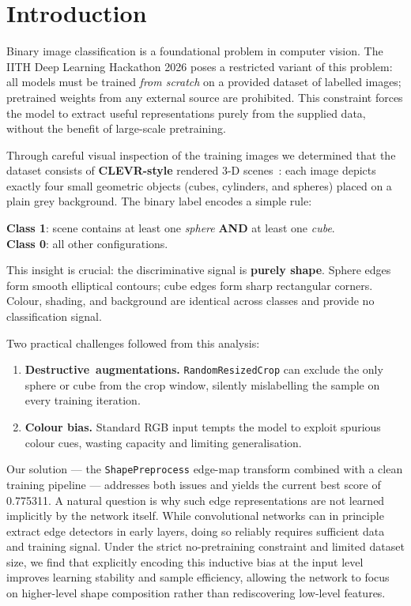 \documentclass{article}
\theoremstyle{plain}
\theoremstyle{definition}
\theoremstyle{remark}
\begin{document}
\section{Introduction}
\label{sec:intro}

Binary image classification is a foundational problem in computer
vision.  The IITH Deep Learning Hackathon 2026 poses a restricted
variant of this problem: all models must be trained \emph{from scratch}
on a provided dataset of labelled images; pretrained weights from any
external source are prohibited.  This constraint forces the model to
extract useful representations purely from the supplied data, without
the benefit of large-scale pretraining.

Through careful visual inspection of the training images we determined
that the dataset consists of \textbf{CLEVR-style} rendered 3-D
scenes~\cite{johnson2017clevr}: each image depicts exactly four small
geometric objects (cubes, cylinders, and spheres) placed on a plain
grey background.  The binary label encodes a simple rule:

\begin{center}
\textbf{Class 1}: scene contains at least one \emph{sphere} \textbf{AND}
at least one \emph{cube}. \\
\textbf{Class 0}: all other configurations.
\end{center}

This insight is crucial: the discriminative signal is \textbf{purely
shape}.  Sphere edges form smooth elliptical contours; cube edges form
sharp rectangular corners.  Colour, shading, and background are
identical across classes and provide no classification signal.

Two practical challenges followed from this analysis:
\begin{enumerate}
\item \textbf{Destructive~augmentations.}  \texttt{RandomResizedCrop}
  can exclude the only sphere or cube from the crop window, silently
  mislabelling the sample on every training iteration.
\item \textbf{Colour bias.}  Standard RGB input tempts the model to
  exploit spurious colour cues, wasting capacity and limiting
  generalisation.
\end{enumerate}

Our solution --- the \texttt{ShapePreprocess} edge-map transform
combined with a clean training pipeline --- addresses both issues and
yields the current best score of 0.775311.
A natural question is why such edge representations are not learned
implicitly by the network itself. While convolutional networks can in
principle extract edge detectors in early layers, doing so reliably
requires sufficient data and training signal. Under the strict
no-pretraining constraint and limited dataset size, we find that
explicitly encoding this inductive bias at the input level improves
learning stability and sample efficiency, allowing the network to focus
on higher-level shape composition rather than rediscovering low-level
features.
\end{document}
